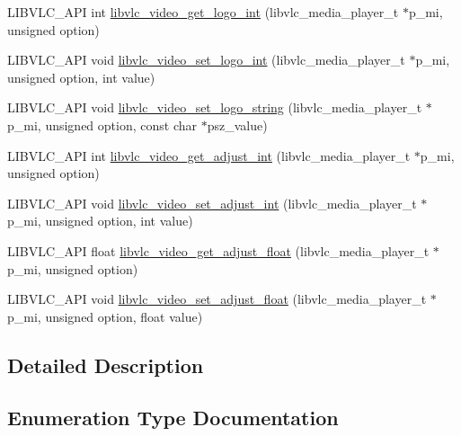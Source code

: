\begin{DoxyCompactItemize}
L\+I\+B\+V\+L\+C\+\_\+\+A\+PI int \hyperlink{group__libvlc__video_ga99563693fed7ad94defde38b9de3c377}{libvlc\+\_\+video\+\_\+get\+\_\+logo\+\_\+int} (libvlc\+\_\+media\+\_\+player\+\_\+t $\ast$p\+\_\+mi, unsigned option)
\item 
L\+I\+B\+V\+L\+C\+\_\+\+A\+PI void \hyperlink{group__libvlc__video_gaecd71e68f9e486423390cc6b4b843724}{libvlc\+\_\+video\+\_\+set\+\_\+logo\+\_\+int} (libvlc\+\_\+media\+\_\+player\+\_\+t $\ast$p\+\_\+mi, unsigned option, int value)
\item 
L\+I\+B\+V\+L\+C\+\_\+\+A\+PI void \hyperlink{group__libvlc__video_ga5ceb01a583ce7887a17fb714de025219}{libvlc\+\_\+video\+\_\+set\+\_\+logo\+\_\+string} (libvlc\+\_\+media\+\_\+player\+\_\+t $\ast$p\+\_\+mi, unsigned option, const char $\ast$psz\+\_\+value)
\item 
L\+I\+B\+V\+L\+C\+\_\+\+A\+PI int \hyperlink{group__libvlc__video_gac23478339fa8aa0a05fdc0b0e1c320a2}{libvlc\+\_\+video\+\_\+get\+\_\+adjust\+\_\+int} (libvlc\+\_\+media\+\_\+player\+\_\+t $\ast$p\+\_\+mi, unsigned option)
\item 
L\+I\+B\+V\+L\+C\+\_\+\+A\+PI void \hyperlink{group__libvlc__video_ga6dceec71808d3a1794f896c4cf4fcc97}{libvlc\+\_\+video\+\_\+set\+\_\+adjust\+\_\+int} (libvlc\+\_\+media\+\_\+player\+\_\+t $\ast$p\+\_\+mi, unsigned option, int value)
\item 
L\+I\+B\+V\+L\+C\+\_\+\+A\+PI float \hyperlink{group__libvlc__video_ga6a510bc707485129457fbf0c4759e72f}{libvlc\+\_\+video\+\_\+get\+\_\+adjust\+\_\+float} (libvlc\+\_\+media\+\_\+player\+\_\+t $\ast$p\+\_\+mi, unsigned option)
\item 
L\+I\+B\+V\+L\+C\+\_\+\+A\+PI void \hyperlink{group__libvlc__video_gad685e41e25c67e27995f60adfacea17b}{libvlc\+\_\+video\+\_\+set\+\_\+adjust\+\_\+float} (libvlc\+\_\+media\+\_\+player\+\_\+t $\ast$p\+\_\+mi, unsigned option, float value)
\end{DoxyCompactItemize}


\subsection{Detailed Description}


\subsection{Enumeration Type Documentation}
\mbox{\label{group__libvlc__video_ga1093996bbcbb93f0d0a49636917f09c4}} 

